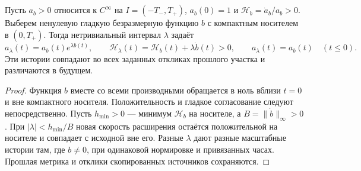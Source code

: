 \begin{samepage}
\section{}\label{sec:future}
\begin{proposition}\label{prop:future}
{Пусть $a_b>0$ относится к $C^\infty$ на $I=(-T_-,T_+)$, $a_b(0)=1$ и $\mathcal H_b=\dot a_b/a_b>0$. Выберем ненулевую гладкую безразмерную функцию $b$ с компактным носителем в $(0,T_+)$. Тогда нетривиальный интервал $\lambda$ задаёт}
\begin{equation}\label{eq:future}
 a_\lambda(t)=a_b(t)e^{\lambda b(t)},\qquad
 \mathcal H_\lambda(t)=\mathcal H_b(t)+\lambda\dot b(t)>0,
 \qquad a_\lambda(t)=a_b(t)\quad(t\leq0).
\end{equation}
{Эти истории совпадают во всех заданных откликах прошлого участка и различаются в будущем.}
\end{proposition}
\begin{proof}
{Функция $b$ вместе со всеми производными обращается в ноль вблизи $t=0$ и вне компактного носителя. Положительность и гладкое согласование следуют непосредственно. Пусть $h_{\min}>0$ --- минимум $\mathcal H_b$ на носителе, а $B=\|\dot b\|_\infty>0$. При $|\lambda|<h_{\min}/B$ новая скорость расширения остаётся положительной на носителе и совпадает с исходной вне его. Разные $\lambda$ дают разные масштабные истории там, где $b\ne0$, при одинаковой нормировке и привязанных часах. Прошлая метрика и отклики скопированных источников сохраняются.}
\end{proof}
\end{samepage}

